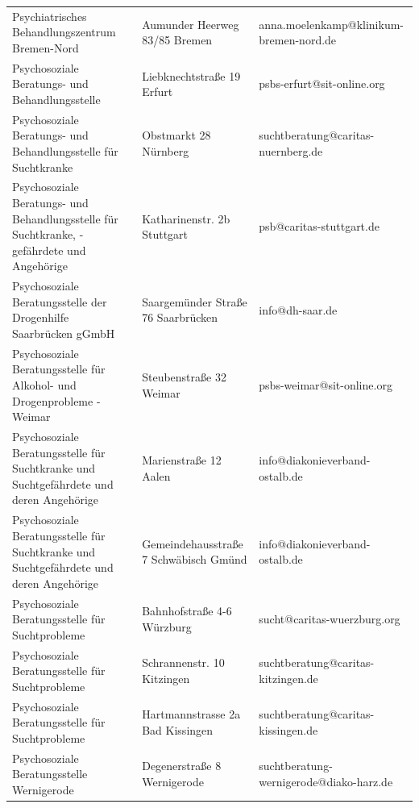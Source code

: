{\begin{xltabular}{\textwidth} {
 >{\raggedright\arraybackslash}p{5cm}
 >{\raggedright\arraybackslash}X
 >{\raggedright\arraybackslash}p{5cm} }
Psychiatrisches Behandlungszentrum Bremen-Nord & Aumunder Heerweg 83/85 Bremen & anna.moelenkamp@klinikum-bremen-nord.de \\
Psychosoziale Beratungs- und Behandlungsstelle & Liebknechtstraße 19 Erfurt & psbs-erfurt@sit-online.org \\
Psychosoziale Beratungs- und Behandlungsstelle für Suchtkranke & Obstmarkt 28 Nürnberg & suchtberatung@caritas-nuernberg.de \\
Psychosoziale Beratungs- und Behandlungsstelle für Suchtkranke, -gefährdete und Angehörige & Katharinenstr. 2b Stuttgart & psb@caritas-stuttgart.de \\
Psychosoziale Beratungsstelle der Drogenhilfe Saarbrücken gGmbH & Saargemünder Straße 76 Saarbrücken & info@dh-saar.de \\
Psychosoziale Beratungsstelle für Alkohol- und Drogenprobleme - Weimar & Steubenstraße 32 Weimar & psbs-weimar@sit-online.org \\
Psychosoziale Beratungsstelle für Suchtkranke und Suchtgefährdete und deren Angehörige & Marienstraße 12 Aalen & info@diakonieverband-ostalb.de \\
Psychosoziale Beratungsstelle für Suchtkranke und Suchtgefährdete und deren Angehörige & Gemeindehausstraße 7 Schwäbisch Gmünd & info@diakonieverband-ostalb.de \\
Psychosoziale Beratungsstelle für Suchtprobleme & Bahnhofstraße 4-6 Würzburg & sucht@caritas-wuerzburg.org \\
Psychosoziale Beratungsstelle für Suchtprobleme & Schrannenstr. 10 Kitzingen & suchtberatung@caritas-kitzingen.de \\
Psychosoziale Beratungsstelle für Suchtprobleme & Hartmannstrasse 2a Bad Kissingen & suchtberatung@caritas-kissingen.de \\
Psychosoziale Beratungsstelle Wernigerode & Degenerstraße 8 Wernigerode & suchtberatung-wernigerode@diako-harz.de \\

\end{xltabular}}
